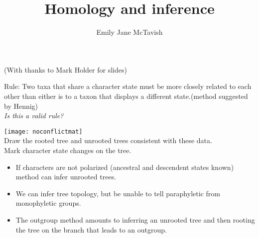 \documentclass{beamer}
\title[*]{Homology and inference}
\author[*]{Emily Jane McTavish}
\institute[*]{
Life and Environmental Sciences\\
University of California, Merced\\
\texttt{ejmctavish@ucmerced.edu, twitter:snacktavish}\\
}
\date{}
\begin{document}
\begin{frame}
\titlepage
(With thanks to Mark Holder for slides) 
\end{frame}













% 

\begin{frame}
Rule: Two taxa that share a character state must be more
closely related to each other than either is to a taxon that
displays a different state.(method suggested by Hennig)\\ 
\textit{Is this a valid rule?}
\end{frame}
% 





\begin{frame}
 \texttt{[image: noconflictmat]}\\
Draw the rooted tree and unrooted trees consistent with these data.\\
Mark character state changes on the tree.
\end{frame}




\begin{frame}
\begin{itemize}
 \item If characters are not polarized (ancestral and descendent states known)
 method can infer unrooted trees.
 \item We can infer tree topology, but be unable to tell paraphyletic from
monophyletic groups.
 \item The outgroup method amounts to inferring an unrooted tree and then
rooting the tree on the branch that leads to an outgroup.
\end{itemize}
\end{frame}
\end{document}
